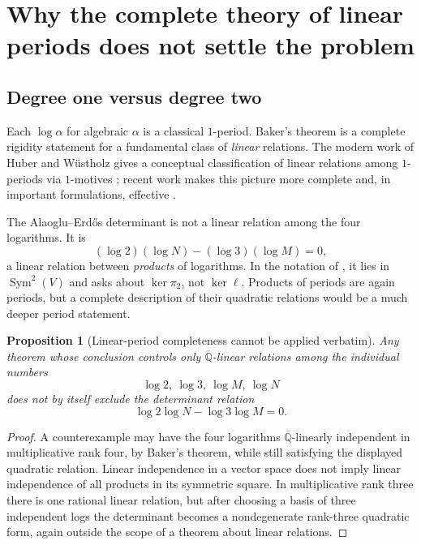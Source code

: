 \documentclass[11pt]{article}
\newtheorem{proposition}[theorem]{Proposition}
\theoremstyle{definition}
\theoremstyle{remark}
\newcommand{\Qbar}{\overline{\mathbb{Q}}}
\newcommand{\Sym}{\operatorname{Sym}}
\newcommand{\ellmap}{\boldsymbol{\ell}}
\begin{document}
\section{Why the complete theory of linear periods does not settle the problem}
\label{sec:period-audit}

\subsection{Degree one versus degree two}

Each $\log\alpha$ for algebraic $\alpha$ is a classical $1$-period.  Baker's theorem is a
complete rigidity statement for a fundamental class of \emph{linear} relations.  The modern
work of Huber and W\"ustholz gives a conceptual classification of linear relations among
$1$-periods via $1$-motives \cite{HW2022}; recent work makes this picture more complete and,
in important formulations, effective \cite{HuberKalck2026,SertozOuaknineWorrell2025}.

The Alaoglu--Erd\H{o}s determinant is not a linear relation among the four logarithms.  It is
\[
 (\log2)(\log N)-(\log3)(\log M)=0,
\]
a linear relation between \emph{products} of logarithms.  In the notation of
, it lies in $\Sym^2(V)$ and asks about $\ker\pi_2$, not
$\ker\ellmap$.  Products of periods are again periods, but a complete description of their
quadratic relations would be a much deeper period statement.

\begin{proposition}[Linear-period completeness cannot be applied verbatim]
\label{prop:linear-period-limit}
Any theorem whose conclusion controls only $\Qbar$-linear relations among the individual
numbers
\[
 \log2,\ \log3,\ \log M,\ \log N
\]
does not by itself exclude the determinant relation
\[
 \log2\log N-\log3\log M=0.
\]
\end{proposition}

\begin{proof}
A counterexample may have the four logarithms $\Qbar$-linearly independent in multiplicative
rank four, by Baker's theorem, while still satisfying the displayed quadratic relation.
Linear independence in a vector space does not imply linear independence of all products in
its symmetric square.  In multiplicative rank three there is one rational linear relation,
but after choosing a basis of three independent logs the determinant becomes a nondegenerate
rank-three quadratic form, again outside the scope of a theorem about linear relations.
\end{proof}
\end{document}
